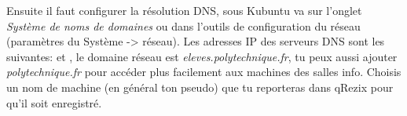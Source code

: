 Ensuite il faut configurer la r\'esolution DNS, sous Kubuntu va sur l'onglet \textit{Syst\`eme de noms de domaines} ou dans l'outils de configuration du r\'eseau
(param\`etres du Syst\`eme -> r\'eseau). Les adresses IP des serveurs DNS sont les suivantes:  et , le domaine r\'eseau
est \textit{eleves.polytechnique.fr}, tu peux aussi ajouter \textit{polytechnique.fr} pour acc\'eder plus facilement aux machines des salles info. Choisis un nom de machine
(en g\'en\'eral ton pseudo) que tu reporteras dans qRezix pour qu'il soit enregistr\'e.
% 
% 
% 
% 
